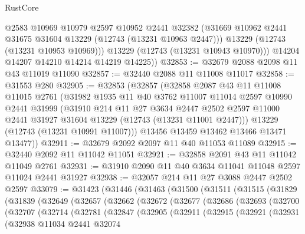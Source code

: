 \begin{lexlean}{RustCore}
\begin{coremodule}
            @2583
            @10969
            @10979
            @2597
            @10952
            @2441
            @32382
            (@31669 @10962 @2441 @31675 @31604 @13229 (@12743 (@13231 @10963 @2447)))
            @13229
            (@12743 (@13231 @10953 @10969)))
          @13229
          (@12743 (@13231 @10943 @10970)))
        @14204
        @14207
        @14210
        @14214
        @14219
        @14225))
@32853 := @32679 @2088 @2098 @11 @43 @11019 @11090
@32857 := @32440 @2088 @11 @11008 @11017
@32858 := @31553 @280
@32905 := @32853
    (@32857
      (@32858
        @2087
        @43
        @11
        @11008
        @11015
        @2761
        (@31982
          @1935
          @11
          @40
          @3762
          @11007
          @11014
          @2597
          @10990
          @2441
          @31999
          (@31910
            @214
            @11
            @27
            @3634
            @2447
            @2502
            @2597
            @11000
            @2441
            @31927
            @31604
            @13229
            (@12743 (@13231 @11001 @2447)))
          @13229
          (@12743 (@13231 @10991 @11007)))
        @13456
        @13459
        @13462
        @13466
        @13471
        @13477))
@32911 := @32679 @2092 @2097 @11 @40 @11053 @11089
@32915 := @32440 @2092 @11 @11042 @11051
@32921 := @32858 @2091 @43 @11 @11042 @11049 @2761
@32931 := @31910 @2090 @11 @40 @3634 @11041 @11048 @2597 @11024 @2441 @31927
@32938 := @32057 @214 @11 @27 @3088 @2447 @2502 @2597
@33079 := @31423
    (@31446
      (@31463
        (@31500
          (@31511
            (@31515
              (@31829
                (@31839
                  (@32649
                    (@32657
                      (@32662
                        (@32672
                          (@32677
                            (@32686
                              (@32693
                                (@32700
                                  (@32707
                                    (@32714
                                      (@32781
                                        (@32847
                                          (@32905
                                            (@32911
                                              (@32915
                                                (@32921
                                                  (@32931
                                                    (@32938
                                                      @11034
                                                      @2441
                                                      @32074

\end{coremodule}
\end{lexlean}
